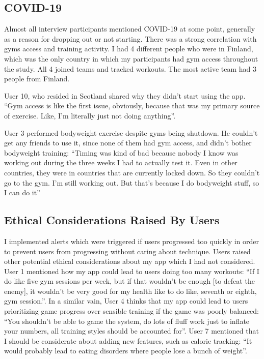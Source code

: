 \documentclass{l4proj}
\begin{document}
\subsection{COVID-19}
Almost all interview participants mentioned COVID-19 at some point, generally as a reason for dropping out or not starting. There was a strong correlation with gyms access and training activity. I had 4 different people who were in Finland, which was the only country in which my participants had gym access throughout the study. All 4 joined teams and tracked workouts. The most active team had 3 people from Finland.

User 10, who resided in Scotland shared why they didn't start using the app. ``Gym access is like the first issue, obviously, because that was my primary source of exercise. Like, I'm literally just not doing anything''.

User 3 performed bodyweight exercise despite gyms being shutdown. He couldn't get any friends to use it, since none of them had gym access, and didn't bother bodyweight training: ``Timing was kind of bad because nobody I know was working out during the three weeks I had to actually test it. Even in other countries, they were in countries that are currently locked down. So they couldn't go to the gym. I'm still working out. But that's because I do bodyweight stuff, so I can do it''

\subsection{Ethical Considerations Raised By Users}
I implemented alerts which were triggered if users progressed too quickly in order to prevent users from progressing without caring about technique. Users raised other potential ethical considerations about my app which I had not considered. User 1 mentioned how my app could lead to users doing too many workouts: ``If I do like five gym sessions per week, but if that wouldn't be enough [to defeat the enemy], it wouldn't be very good for my health like to do like, seventh or eighth, gym session.''. In a similar vain, User 4 thinks that my app could lead to users prioritizing game progress over sensible training if the game was poorly balanced: ``You shouldn't be able to game the system, do lots of fluff work just to inflate your numbers, all training styles should be accounted for''. User 7 mentioned that I should be considerate about adding new features, such as calorie tracking: ``It would probably lead to eating disorders where people lose a bunch of weight''.
\end{document}
